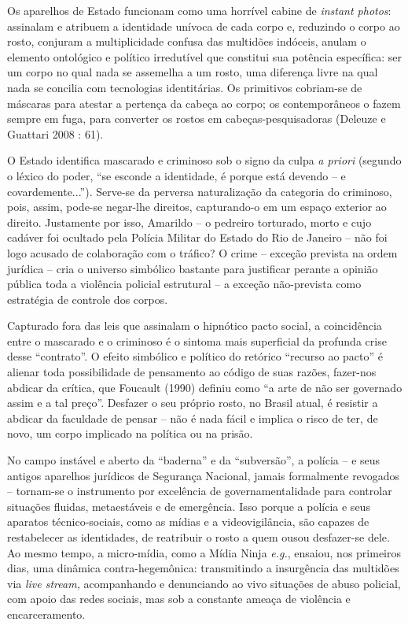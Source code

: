 Os aparelhos de Estado funcionam como uma horrível cabine de
\emph{instant photos}: assinalam e atribuem a identidade unívoca de cada
corpo e, reduzindo o corpo ao rosto, conjuram a multiplicidade confusa
das multidões indóceis, anulam o elemento ontológico e político
irredutível que constitui sua potência específica: ser um corpo no qual
nada se assemelha a um rosto, uma diferença livre na qual nada se
concilia com tecnologias identitárias. Os primitivos cobriam-se de
máscaras para atestar a pertença da cabeça ao corpo; os contemporâneos o
fazem sempre em fuga, para converter os rostos em cabeças-pesquisadoras
(Deleuze e Guattari 2008 : 61).

O Estado identifica mascarado e criminoso sob o signo da culpa \emph{a
priori }(segundo o léxico do poder, ``se esconde a identidade, é porque
está devendo -- e covardemente...''). Serve-se da perversa naturalização
da categoria do criminoso, pois, assim, pode-se negar-lhe direitos,
capturando-o em um espaço exterior ao direito. Justamente por isso,
Amarildo -- o pedreiro torturado, morto e cujo cadáver foi ocultado pela
Polícia Militar do Estado do Rio de Janeiro -- não foi logo acusado de
colaboração com o tráfico? O crime -- exceção prevista na ordem jurídica
-- cria o universo simbólico bastante para justificar perante a opinião
pública toda a violência policial estrutural -- a exceção não-prevista
como estratégia de controle dos corpos.

Capturado fora das leis que assinalam o hipnótico pacto social, a
coincidência entre o mascarado e o criminoso é o sintoma mais
superficial da profunda crise desse ``contrato''. O efeito simbólico e
político do retórico ``recurso ao pacto'' é alienar toda possibilidade
de pensamento ao código de suas razões, fazer-nos abdicar da crítica,
que Foucault (1990) definiu como ``a arte de não ser governado assim e a
tal preço''. Desfazer o seu próprio rosto, no Brasil atual, é resistir a
abdicar da faculdade de pensar -- não é nada fácil e implica o risco de
ter, de novo, um corpo implicado na política ou na prisão.

No campo instável e aberto da ``baderna'' e da ``subversão'', a polícia
-- e seus antigos aparelhos jurídicos de Segurança Nacional, jamais
formalmente revogados -- tornam-se o instrumento por excelência de
governamentalidade para controlar situações fluidas, metaestáveis e de
emergência. Isso porque a polícia e seus aparatos técnico-sociais, como
as mídias e a videovigilância, são capazes de restabelecer as
identidades, de reatribuir o rosto a quem ousou desfazer-se dele. Ao
mesmo tempo, a micro-mídia, como a Mídia Ninja \emph{e.g.}, ensaiou, nos
primeiros dias, uma dinâmica contra-hegemônica: transmitindo a
insurgência das multidões via \emph{live stream, }acompanhando e
denunciando ao vivo situações de abuso policial, com apoio das redes
sociais, mas sob a constante ameaça de violência e encarceramento.

